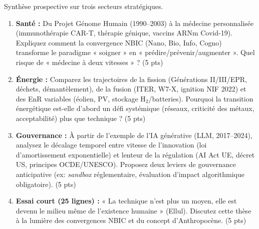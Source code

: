 \documentclass[11pt]{article}
\begin{document}
\begin{exercice}
Synthèse prospective sur trois secteurs stratégiques.
\begin{enumerate}
    \item \textbf{Santé :} Du Projet Génome Humain (1990--2003) à la médecine personnalisée (immunothérapie CAR-T, thérapie génique, vaccins ARNm Covid-19). Expliquez comment la convergence NBIC (Nano, Bio, Info, Cogno) transforme le paradigme « soigner » en « prédire/prévenir/augmenter ». Quel risque de « médecine à deux vitesses » ? \hfill (5 pts)
    \item \textbf{Énergie :} Comparez les trajectoires de la fission (Générations II/III/EPR, déchets, démantèlement), de la fusion (ITER, W7-X, ignition NIF 2022) et des EnR variables (éolien, PV, stockage H$_2$/batteries). Pourquoi la transition énergétique est-elle d'abord un défi systémique (réseaux, criticité des métaux, acceptabilité) plus que technique ? \hfill (5 pts)
    \item \textbf{Gouvernance :} À partir de l'exemple de l'IA générative (LLM, 2017--2024), analysez le décalage temporel entre vitesse de l'innovation (loi d'amortissement exponentielle) et lenteur de la régulation (AI Act UE, décret US, principes OCDE/UNESCO). Proposez deux leviers de gouvernance anticipative (ex: \textit{sandbox} réglementaire, évaluation d'impact algorithmique obligatoire). \hfill (5 pts)
    \item \textbf{Essai court (25 lignes) :} « La technique n'est plus un moyen, elle est devenu le milieu même de l'existence humaine » (Ellul). Discutez cette thèse à la lumière des convergences NBIC et du concept d'Anthropocène. \hfill (5 pts)
\end{enumerate}
\end{exercice}
\end{document}
